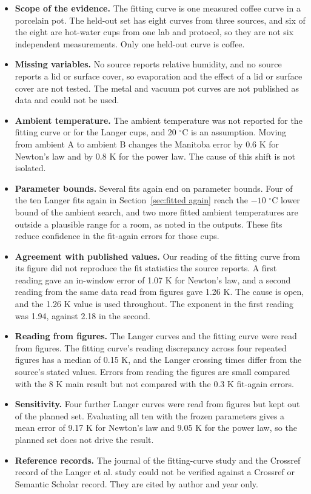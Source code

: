 \documentclass[11pt,letterpaper]{article}
\begin{document}
\begin{itemize}
  \item \textbf{Scope of the evidence.} The fitting curve is one measured coffee curve in a porcelain pot. The held-out set has eight curves from three sources, and six of the eight are hot-water cups from one lab and protocol, so they are not six independent measurements. Only one held-out curve is coffee.
  \item \textbf{Missing variables.} No source reports relative humidity, and no source reports a lid or surface cover, so evaporation and the effect of a lid or surface cover are not tested. The metal and vacuum pot curves are not published as data and could not be used.
  \item \textbf{Ambient temperature.} The ambient temperature was not reported for the fitting curve or for the Langer cups, and 20 $^\circ$C is an assumption. Moving from ambient A to ambient B changes the Manitoba error by 0.6 K for Newton's law and by 0.8 K for the power law. The cause of this shift is not isolated.
  \item \textbf{Parameter bounds.} Several fits again end on parameter bounds. Four of the ten Langer fits again in Section~\ref{sec:fitted again} reach the $-10$ $^\circ$C lower bound of the ambient search, and two more fitted ambient temperatures are outside a plausible range for a room, as noted in the outputs. These fits reduce confidence in the fit-again errors for those cups.
  \item \textbf{Agreement with published values.} Our reading of the fitting curve from its figure did not reproduce the fit statistics the source reports. A first reading gave an in-window error of 1.07 K for Newton's law, and a second reading from the same data read from figures gave 1.26 K. The cause is open, and the 1.26 K value is used throughout. The exponent in the first reading was 1.94, against 2.18 in the second.
  \item \textbf{Reading from figures.} The Langer curves and the fitting curve were read from figures. The fitting curve's reading discrepancy across four repeated figures has a median of 0.15 K, and the Langer crossing times differ from the source's stated values. Errors from reading the figures are small compared with the 8 K main result but not compared with the 0.3 K fit-again errors.
  \item \textbf{Sensitivity.} Four further Langer curves were read from figures but kept out of the planned set. Evaluating all ten with the frozen parameters gives a mean error of 9.17 K for Newton's law and 9.05 K for the power law, so the planned set does not drive the result.
  \item \textbf{Reference records.} The journal of the fitting-curve study and the Crossref record of the Langer et al. study could not be verified against a Crossref or Semantic Scholar record. They are cited by author and year only.
\end{itemize}
\end{document}
